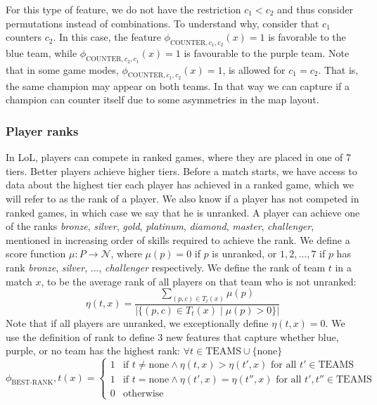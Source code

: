 For this type of feature, we do not have the restriction $c_1 < c_2$ and thus consider permutations instead of combinations.
To understand why, consider that $c_1$ counters $c_2$.
In this case, the feature $\phi_{\text{COUNTER},c_1,c_2}(x) = 1$ is favorable to the blue team, while $\phi_{\text{COUNTER},c_2,c_1}(x) = 1$ is favourable to the purple team.
Note that in some game modes, $\phi_{\text{COUNTER},c_1,c_2}(x) = 1$, is allowed for $c_1 = c_2$. That is, the same champion may appear on both teams.
In that way we can capture if a champion can counter itself due to some asymmetries in the map layout.

\subsubsection{Player ranks}
In LoL, players can compete in ranked games, where they are placed in one of 7 tiers. Better players achieve higher tiers.
Before a match starts, we have access to data about the highest tier each player has achieved in a ranked game, which we will refer to as the rank of a player. We also know if a player has not competed in ranked games, in which case we say that he is unranked.
A player can achieve one of the ranks \textit{bronze}, \textit{silver}, \textit{gold}, \textit{platinum}, \textit{diamond}, \textit{master}, \textit{challenger}, mentioned in increasing order of skills required to achieve the rank.
We define a score function $\mu : P \rightarrow \mathcal{N}$, where $\mu(p) = 0$ if $p$ is unranked, or $1, 2, \dots, 7$ if $p$ has rank \textit{bronze}, \textit{silver}, $\dots$, \textit{challenger} respectively.
We define the rank of team $t$ in a match $x$, to be the average rank of all players on that team who is not unranked:
\begin{equation}\label{eq:eta}
\eta(t, x) = \frac{\sum\limits_{(p,c) \in T_t(x)} \mu(p)}{|\{(p, c) \in T_t(x) \mid \mu(p) > 0\}|}
\end{equation}
Note that if all players are unranked, we exceptionally define $\eta(t, x) = 0$. We use the definition of rank to define 3 new features that capture whether blue, purple, or no team has the highest rank:
$\forall t \in \text{TEAMS} \cup \{\text{none}\}$
\begin{equation}\label{eq:bestrank}
\phi_\text{BEST-RANK},t(x) = 
\begin{cases} 
  1 & \text{if } t \neq \text{none} \wedge \eta(t,x) > \eta(t',x) \text{ for all } t' \in \text{TEAMS}\\
  1 & \text{if } t = \text{none} \wedge \eta(t',x) = \eta(t'',x) \text{ for all } t',t'' \in \text{TEAMS}\\
  0 & \text{otherwise} 
\end{cases}  
\end{equation}

